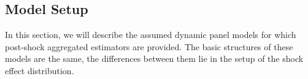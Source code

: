 \documentclass[11pt]{article}
\theoremstyle{definition}
\begin{document}



\subsection{Model Setup}

\label{modelsetup}

In this section, we will describe the assumed dynamic panel models for which 
post-shock aggregated estimators are provided. The basic structures of these models 
are the same, the differences between them lie in the setup of the shock effect 
distribution.
\end{document}
